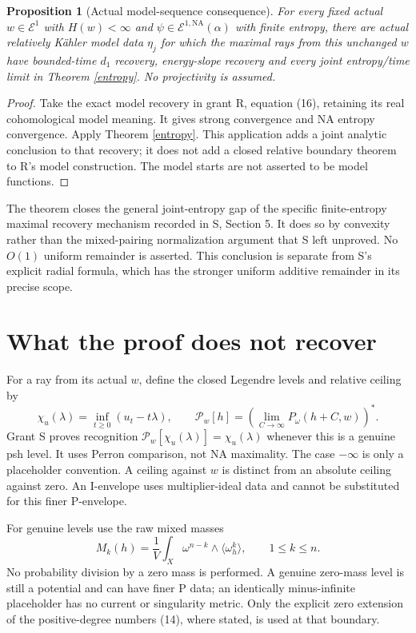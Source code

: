 \documentclass[11pt]{article}
\newtheorem{proposition}[theorem]{Proposition}
\newcommand{\NA}{\mathrm{NA}}
\begin{document}
\begin{proposition}[Actual model-sequence consequence]\label{models}
For every fixed actual $w\in\mathcal E^1$ with $H(w)<\infty$ and
$\psi\in\mathcal E^{1,\NA}(\alpha)$ with finite entropy,
there are actual relatively K\"ahler model data $\eta_j$ for which
the maximal rays from this unchanged $w$ have bounded-time $d_1$
recovery, energy-slope recovery and every joint entropy/time limit
in Theorem \ref{entropy}. No projectivity is assumed.
\end{proposition}
\begin{proof}
Take the exact model recovery in grant R, equation (16), retaining
its real cohomological model meaning. It gives strong convergence
and NA entropy convergence. Apply Theorem \ref{entropy}.
This application adds a joint analytic conclusion to that recovery;
it does not add a closed relative boundary theorem to R's model
construction. The model starts are not asserted to be model functions.
\end{proof}

The theorem closes the general joint-entropy gap of the specific
finite-entropy maximal recovery mechanism recorded in S, Section 5.
It does so by convexity rather than the mixed-pairing normalization
argument that S left unproved. No $O(1)$ uniform remainder is asserted.
This conclusion is separate from S's explicit radial formula, which
has the stronger uniform additive remainder in its precise scope.

\section{What the proof does not recover}
For a ray from its actual $w$, define the closed Legendre levels and
relative ceiling by
\[
 \chi_u(\lambda)=\inf_{t\ge0}(u_t-t\lambda),\qquad
 \mathscr P_w[h]=\left(\lim_{C\to\infty}P_\omega(h+C,w)\right)^*.
 \tag{13}
\]
Grant S proves recognition $\mathscr P_w[\chi_u(\lambda)]
=\chi_u(\lambda)$ whenever this is a genuine psh level. It uses
Perron comparison, not NA maximality. The case $-\infty$ is only
a placeholder convention. A ceiling against $w$ is distinct from
an absolute ceiling against zero. An I-envelope uses multiplier-ideal
data and cannot be substituted for this finer P-envelope.

For genuine levels use the raw mixed masses
\[
 M_k(h)=\frac1V\int_X\omega^{n-k}\wedge
                 \langle\omega_h^k\rangle,\qquad 1\le k\le n.
 \tag{14}
\]
No probability division by a zero mass is performed. A genuine
zero-mass level is still a potential and can have finer P data;
an identically minus-infinite placeholder has no current or
singularity metric. Only the explicit zero extension of the
positive-degree numbers (14), where stated, is used at that boundary.
\end{document}

